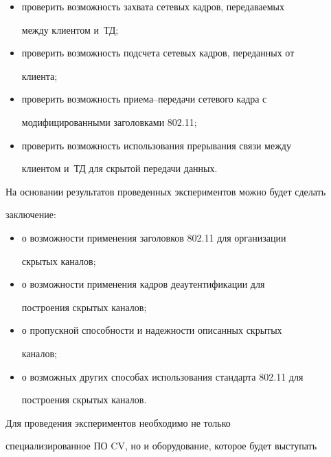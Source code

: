   \begin{itemize}


\item проверить возможность захвата сетевых кадров, передаваемых


между клиентом и~ТД;


\item проверить возможность подсчета сетевых кадров, переданных от


клиента;


\item проверить возможность приема--пе\-ре\-да\-чи сетевого кадра с


модифицированными заголовками 802.11;


\item проверить возможность использования прерывания связи между


клиентом и~ТД для скрытой передачи данных.


\end{itemize}





На основании результатов проведенных экспериментов можно будет сделать


заключение:


\begin{itemize}


\item о возможности применения заголовков 802.11 для организации


скрытых каналов;


\item о возможности применения кадров деаутентификации для


построения скрытых каналов;


\item о пропускной способности и надежности описанных скрытых


каналов;


\item о возможных других способах использования стандарта 802.11 для


по\-стро\-ения скрытых каналов.


\end{itemize}





   Для проведения экспериментов необходимо не только


специализированное ПО CV, но и оборудование, которое будет выступать


